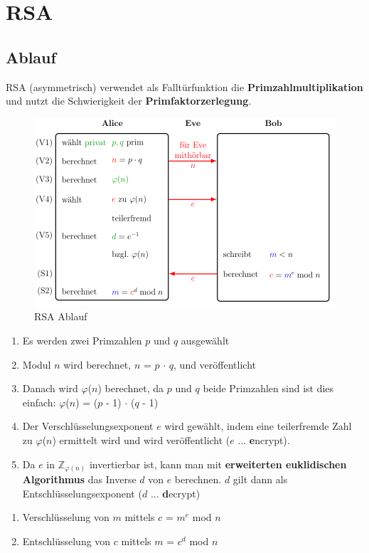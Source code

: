 \chapter{RSA}
\section{Ablauf}
RSA (asymmetrisch) verwendet als Falltürfunktion die \textbf{Primzahlmultiplikation} und nutzt die Schwierigkeit der \textbf{Primfaktorzerlegung}.

\begin{figure}[H]
	\centering
	\includegraphics[width=1.0\linewidth]{figures/rsa_basic.png}
	\caption{RSA Ablauf}
\end{figure}
\begin{enumerate}[leftmargin=*,label={\textbf{V\arabic*\:}}]
	\item Es werden zwei Primzahlen $p$ und $q$ ausgewählt
	\item Modul $n$ wird berechnet, $n$ = $p$ $\cdot$ $q$, und veröffentlicht
	\item Danach wird $\varphi$($n$) berechnet, da $p$ und $q$ beide Primzahlen sind ist dies einfach: $\varphi$($n$) = ($p$ - 1) $\cdot$ ($q$ - 1)
	\item Der Verschlüsselungsexponent $e$ wird gewählt, indem eine teilerfremde Zahl zu $\varphi$($n$) ermittelt wird und wird veröffentlicht ($e$ ... \textbf{e}ncrypt).
	\item Da $e$ in $\mathbb{Z}_{\varphi(n)}$ invertierbar ist, kann man mit \textbf{erweiterten euklidischen Algorithmus} das Inverse $d$ von $e$ berechnen. $d$ gilt dann als Entschlüsselungsexponent ($d$ ... \textbf{d}ecrypt)
\end{enumerate}
\begin{enumerate}[leftmargin=*,label={\textbf{S\arabic*\:}}]
	\item Verschlüsselung von $m$ mittels $c$ = $m^e$ mod $n$
	\item Entschlüsselung von $c$ mittels $m$ = $c^d$ mod $n$
\end{enumerate}

